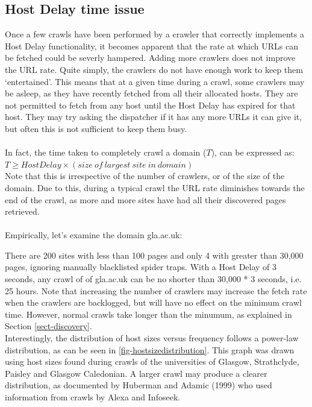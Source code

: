 \subsection{Host Delay time issue}
Once a few crawls have been performed by a crawler that correctly implements a Host Delay functionality, it becomes apparent that the rate at which URLs can be fetched could be severly hampered. Adding more crawlers does not improve the URL rate. Quite simply, the crawlers do not have enough work to keep them `entertained'. This means that at a given time during a crawl, some crawlers may be asleep, as they have recently fetched from all their allocated hosts. They are not permitted to fetch from any host until the Host Delay has expired for that host. They may try asking the dispatcher if it has any more URLs it can give it, but often this is not sufficient to keep them busy.\\
\ \\
In fact, the time taken to completely crawl a domain ($T$), can be expressed as:
\ \\
\indent $T \geq HostDelay \times (size\ of\ largest\ site\ in\ domain)$
\ \\
Note that this is irrespective of the number of crawlers, or of the size of the domain.
Due to this, during a typical crawl the URL rate diminishes towards the end of the crawl, as more and more sites have had all their discovered pages retrieved.\\
\ \\
Empirically, let's examine the domain gla.ac.uk:

There are 200 sites with less than 100 pages and only 4 with greater than 30,000 pages, ignoring manually blacklisted spider traps. With a Host Delay of 3 seconds, any crawl of of gla.ac.uk can be no shorter than 30,000 * 3 seconds, i.e. 25 hours. Note that increasing the number of crawlers may increase the fetch rate when the crawlers are backlogged, but will have no effect on the minimum crawl time. However, normal crawls take longer than the minumum, as explained in Section \ref{sect-discovery}.
\ \\
Interestingly, the distribution of host sizes versus frequency follows a power-law distribution, as can be seen in \ref{fig-hostsizedistribution}. This graph was drawn using host sizes found during crawls of the universities of Glasgow, Strathclyde, Paisley and Glasgow Caledonian. A larger crawl may produce a clearer distribution, as documented by Huberman and Adamic (1999)\cite{ref15} who used information from crawls by Alexa and Infoseek.

